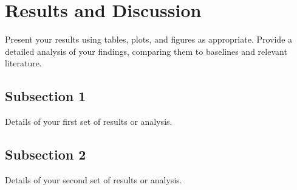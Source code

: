 \section{Results and Discussion}
Present your results using tables, plots, and figures as appropriate. Provide a detailed analysis of your findings, comparing them to baselines and relevant literature.

\subsection{Subsection 1}
Details of your first set of results or analysis.

\subsection{Subsection 2}
Details of your second set of results or analysis.